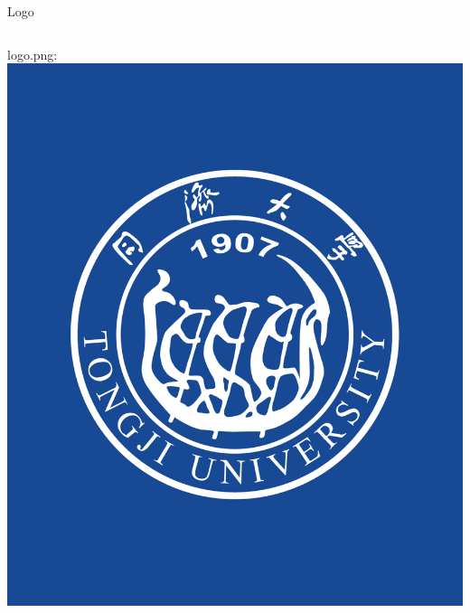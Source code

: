 \documentclass{beamer}
\begin{document}
\begin{frame}[fragile]{Logo}
\begin{columns}
\begin{column}{0.3\textwidth}
logo.png:
\includegraphics[width=\textwidth]
{figures/logo}
\end{column}
\end{columns}
\end{frame}
\end{document}
